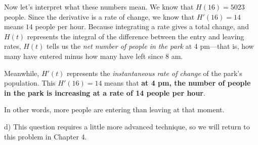 \begin{tcolorbox}[solution]
    Now let's interpret what these numbers mean. We know that $H(16) = 5023$ people. Since the derivative is a rate of change, we know that $H'(16) = 14$ means $14$ people per hour. Because integrating a rate gives a total change, and $H(t)$ represents the integral of the difference between the entry and leaving rates, $H(t)$ tells us the \textit{net number of people in the park} at 4 pm---that is, how many have entered minus how many have left since 8 am. \par
    \vspace{11pt}
    Meanwhile, $H'(t)$ represents the \textit{instantaneous rate of change} of the park's population. This $H'(16) = 14$ means that \textbf{at 4 pm, the number of people in the park is increasing at a rate of 14 people per hour}. \par
    \vspace{11pt}
    In other words, more people are entering than leaving at that moment. \par
    \vspace{11pt}
    d) This question requires a little more advanced technique, so we will return to this problem in Chapter 4.
\end{tcolorbox} \vspace{11pt}

